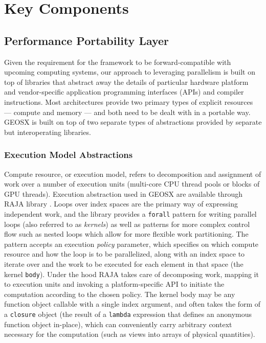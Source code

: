 \section{Key Components}
\label{sec:geosx_components}

\subsection{Performance Portability Layer}
\label{subsec:geosx_components_portability}

Given the requirement for the framework to be forward-compatible with upcoming computing systems, our approach to leveraging parallelism is built on top of libraries that abstract away the details of particular hardware platform and vendor-specific application programming interfaces (APIs) and compiler instructions.   Most architectures provide two primary types of explicit resources --- compute and memory --- and both need to be dealt with in a portable way.   GEOSX is built on top of two separate types of abstractions provided by separate but interoperating libraries.

\subsubsection{Execution Model Abstractions}

Compute resource, or execution model, refers to decomposition and assignment of work over a number of execution units (multi-core CPU thread pools or blocks of GPU threads).   Execution abstraction used in GEOSX are available through RAJA library \cite{Beckingsale2019,raja}.   Loops over index spaces are the primary way of expressing independent work, and the library provides a \texttt{forall} pattern for writing parallel loops (also referred to as \textit{kernels}) as well as patterns for more complex control flow such as nested loops which allow for more flexible work partitioning.   The pattern accepts an execution \textit{policy} parameter, which specifies on which compute resource and how the loop is to be parallelized, along with an index space to iterate over and the work to be executed for each element in that space (the kernel \texttt{body}).   Under the hood RAJA takes care of decomposing work, mapping it to execution units and invoking a platform-specific API to initiate the computation according to the chosen policy.   The kernel body may be any function object callable with a single index argument, and often takes the form of a \texttt{closure} object (the result of a \texttt{lambda} expression that defines an anonymous function object in-place), which can conveniently carry arbitrary context necessary for the computation (such as views into arrays of physical quantities).   

